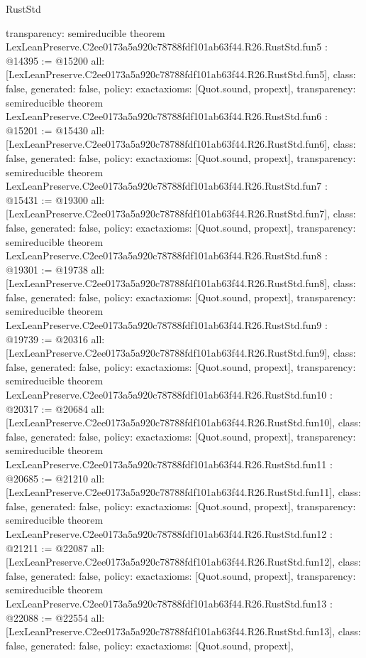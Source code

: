 \begin{lexlean}{RustStd}
\begin{coremodule}
{  transparency: semireducible
}
theorem LexLeanPreserve.C2ee0173a5a920c78788fdf101ab63f44.R26.RustStd.fun5 : @14395 := @15200 {
  all: [LexLeanPreserve.C2ee0173a5a920c78788fdf101ab63f44.R26.RustStd.fun5],
  class: false,
  generated: false,
  policy: exact{axioms: [Quot.sound, propext]},
  transparency: semireducible
}
theorem LexLeanPreserve.C2ee0173a5a920c78788fdf101ab63f44.R26.RustStd.fun6 : @15201 := @15430 {
  all: [LexLeanPreserve.C2ee0173a5a920c78788fdf101ab63f44.R26.RustStd.fun6],
  class: false,
  generated: false,
  policy: exact{axioms: [Quot.sound, propext]},
  transparency: semireducible
}
theorem LexLeanPreserve.C2ee0173a5a920c78788fdf101ab63f44.R26.RustStd.fun7 : @15431 := @19300 {
  all: [LexLeanPreserve.C2ee0173a5a920c78788fdf101ab63f44.R26.RustStd.fun7],
  class: false,
  generated: false,
  policy: exact{axioms: [Quot.sound, propext]},
  transparency: semireducible
}
theorem LexLeanPreserve.C2ee0173a5a920c78788fdf101ab63f44.R26.RustStd.fun8 : @19301 := @19738 {
  all: [LexLeanPreserve.C2ee0173a5a920c78788fdf101ab63f44.R26.RustStd.fun8],
  class: false,
  generated: false,
  policy: exact{axioms: [Quot.sound, propext]},
  transparency: semireducible
}
theorem LexLeanPreserve.C2ee0173a5a920c78788fdf101ab63f44.R26.RustStd.fun9 : @19739 := @20316 {
  all: [LexLeanPreserve.C2ee0173a5a920c78788fdf101ab63f44.R26.RustStd.fun9],
  class: false,
  generated: false,
  policy: exact{axioms: [Quot.sound, propext]},
  transparency: semireducible
}
theorem LexLeanPreserve.C2ee0173a5a920c78788fdf101ab63f44.R26.RustStd.fun10 : @20317 := @20684 {
  all: [LexLeanPreserve.C2ee0173a5a920c78788fdf101ab63f44.R26.RustStd.fun10],
  class: false,
  generated: false,
  policy: exact{axioms: [Quot.sound, propext]},
  transparency: semireducible
}
theorem LexLeanPreserve.C2ee0173a5a920c78788fdf101ab63f44.R26.RustStd.fun11 : @20685 := @21210 {
  all: [LexLeanPreserve.C2ee0173a5a920c78788fdf101ab63f44.R26.RustStd.fun11],
  class: false,
  generated: false,
  policy: exact{axioms: [Quot.sound, propext]},
  transparency: semireducible
}
theorem LexLeanPreserve.C2ee0173a5a920c78788fdf101ab63f44.R26.RustStd.fun12 : @21211 := @22087 {
  all: [LexLeanPreserve.C2ee0173a5a920c78788fdf101ab63f44.R26.RustStd.fun12],
  class: false,
  generated: false,
  policy: exact{axioms: [Quot.sound, propext]},
  transparency: semireducible
}
theorem LexLeanPreserve.C2ee0173a5a920c78788fdf101ab63f44.R26.RustStd.fun13 : @22088 := @22554 {
  all: [LexLeanPreserve.C2ee0173a5a920c78788fdf101ab63f44.R26.RustStd.fun13],
  class: false,
  generated: false,
  policy: exact{axioms: [Quot.sound, propext]},
}
\end{coremodule}
\end{lexlean}
